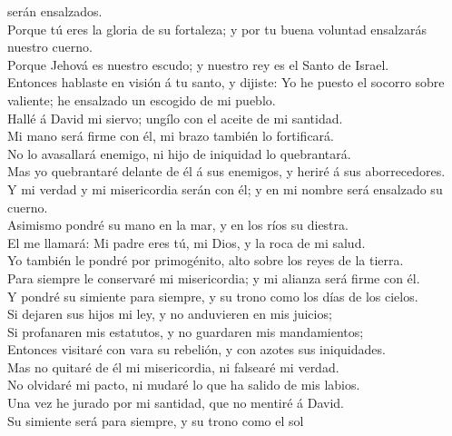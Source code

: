 serán ensalzados.\\
 Porque tú eres la gloria de su fortaleza; y por tu buena
voluntad ensalzarás nuestro cuerno.\\
 Porque Jehová es nuestro escudo; y nuestro rey es el
Santo de Israel.\\
 Entonces hablaste en visión á tu santo, y dijiste: Yo he
puesto el socorro sobre valiente; he ensalzado un escogido de mi
pueblo.\\
 Hallé á David mi siervo; ungílo con el aceite de mi
santidad.\\
 Mi mano será firme con él, mi brazo también lo
fortificará.\\
 No lo avasallará enemigo, ni hijo de iniquidad lo
quebrantará.\\
 Mas yo quebrantaré delante de él á sus enemigos, y
heriré á sus aborrecedores.\\
 Y mi verdad y mi misericordia serán con él; y en mi
nombre será ensalzado su cuerno.\\
 Asimismo pondré su mano en la mar, y en los ríos su
diestra.\\
 El me llamará: Mi padre eres tú, mi Dios, y la roca de
mi salud.\\
 Yo también le pondré por primogénito, alto sobre los
reyes de la tierra.\\
 Para siempre le conservaré mi misericordia; y mi alianza
será firme con él.\\
 Y pondré su simiente para siempre, y su trono como los
días de los cielos.\\
 Si dejaren sus hijos mi ley, y no anduvieren en mis
juicios;\\
 Si profanaren mis estatutos, y no guardaren mis
mandamientos;\\
 Entonces visitaré con vara su rebelión, y con azotes sus
iniquidades.\\
 Mas no quitaré de él mi misericordia, ni falsearé mi
verdad.\\
 No olvidaré mi pacto, ni mudaré lo que ha salido de mis
labios.\\
 Una vez he jurado por mi santidad, que no mentiré á
David.\\
 Su simiente será para siempre, y su trono como el sol
